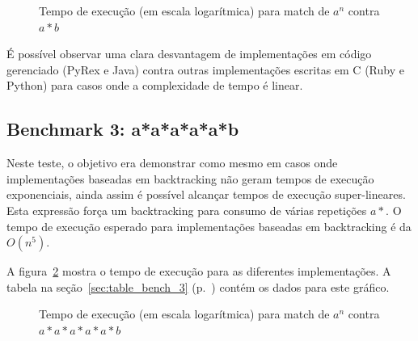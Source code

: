 \documentclass[a4paper,12pt,oneside,onecolumn]{uerj}
\begin{document}
\begin{figure}[!htbp]
\centering
{}
\caption{Tempo de execução (em escala logarítmica) para match de $a^n$ contra $a*b$}
\label{fig:graph_bench_2}
\end{figure}

É possível observar uma clara desvantagem de implementações em código gerenciado (PyRex e Java) contra outras implementações escritas em C (Ruby e Python) para casos onde a complexidade de tempo é linear.

\subsection{Benchmark 3: a*a*a*a*a*b}

Neste teste, o objetivo era demonstrar como mesmo em casos onde implementações baseadas em backtracking não geram tempos de execução exponenciais, ainda assim é possível alcançar tempos de execução super-lineares. Esta expressão força um backtracking para consumo de várias repetições $a*$. O tempo de execução esperado para implementações baseadas em backtracking é da $O(n^5)$.

A figura~\ref{fig:graph_bench_3} mostra o tempo de execução para as diferentes implementações. A tabela na seção~\ref{sec:table_bench_3} (p.~\pageref{sec:table_bench_3}) contém os dados para este gráfico.

\begin{figure}[!htbp]
\centering
{}
\caption{Tempo de execução (em escala logarítmica) para match de $a^n$ contra $a*a*a*a*a*b$}
\label{fig:graph_bench_3}
\end{figure}
\end{document}
